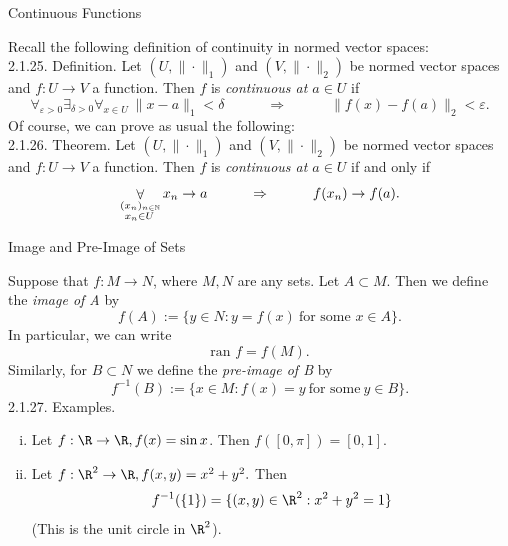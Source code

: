 \documentclass[smaller,hyperref={CJKbookmarks=true}]{beamer}
\newcommand{\N}{\mathbb{N}}
\begin{document}
\begin{frame}[t]{Continuous Functions}
\begin{spacing}{1.1}
Recall the following definition of continuity in normed vector spaces:\\[6pt]
\alert{2.1.25. Definition.} Let $(U,\|\cdot\|_1)$ and $(V,\|\cdot\|_2)$ be normed vector spaces and $f:U\to V$ a function. Then $f$ is \emph{continuous at $a\in U$} if
\begin{equation}\label{2.1.9}
  \mathop{\forall}_{\varepsilon>0}\mathop{\exists}_{\delta>0}\mathop{\forall}_{x\in U}~\|x-a\|_1<\delta\qquad\quad\Rightarrow\qquad\quad\|f(x)-f(a)\|_2<\varepsilon.
\end{equation}
\vspace*{9pt}
Of course, we can prove as usual the following:\\
\alert{2.1.26. Theorem.} Let $(U,\|\cdot\|_1)$ and $(V,\|\cdot\|_2)$ be normed vector spaces and $f:U\to V$ a function. Then $f$ is \emph{continuous at $a\in U$} if and only if
\begin{equation}\label{2.1.10}
  \mathop{\forall}_{\begin{subarray}
                      ~(x_n)_{n\in\N}\\
                      ~x_n\in U
                    \end{subarray}}x_n\to a\qquad\quad\Rightarrow\qquad\quad f(x_n)\to f(a).
\end{equation}
\end{spacing}
\end{frame}
\begin{frame}[t]{Image and Pre-Image of Sets}
\begin{spacing}{0.9}
Suppose that $f:M\to N$, where $M,N$ are any sets. Let $A\subset M$. Then we define the \emph{image of A} by
\[f(A):=\{y\in N:y=f(x)~\text{for some }x\in A\}.\]
In particular, we can write
\[\text{ran }f=f(M).\]
Similarly, for $B\subset N$ we define the \emph{pre-image of B} by
\begin{equation}\label{2.1.11}
  f^{-1}(B):=\{x\in M:f(x)=y~\text{for some}~y\in B\}.
\end{equation}
\alert{2.1.27. Examples.}\\
\begin{enumerate}[(i)]
  \item Let $f:\R\to\R,f(x)=\sin x$. Then $f([0,\pi])=[0,1]$.
  \item Let $f:\R^2\to\R,f(x,y)=x^2+y^2.$ Then
  \[f^{-1}(\{1\})=\{(x,y)\in\R^2:x^2+y^2=1\}\]
(This is the unit circle in $\R^2$).
\end{enumerate}
\end{spacing}
\end{frame}
\end{document}
